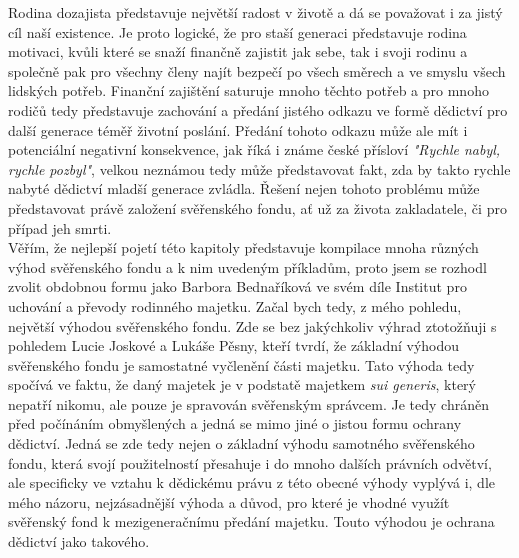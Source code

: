 \documentclass{article}
\begin{document}
 Rodina dozajista představuje největší radost v životě a dá se považovat i za jistý cíl naší existence. Je proto logické, že pro staší generaci představuje rodina motivaci, kvůli které se snaží finančně zajistit jak sebe, tak i svoji rodinu a společně pak pro všechny členy najít bezpečí po všech směrech a ve smyslu všech lidských potřeb. Finanční zajištění saturuje mnoho těchto potřeb a pro mnoho rodičů tedy představuje zachování a předání jistého odkazu ve formě dědictví pro další generace téměř životní poslání. Předání tohoto odkazu může ale mít i potenciální negativní konsekvence, jak říká i známe české přísloví \textit{"Rychle nabyl, rychle pozbyl"}, velkou neznámou tedy může představovat fakt, zda by takto rychle nabyté dědictví mladší generace zvládla. Řešení nejen tohoto problému může představovat právě založení svěřenského fondu, ať už za života zakladatele, či pro případ jeh smrti.\\
 
 Věřím, že nejlepší pojetí této kapitoly představuje kompilace mnoha různých výhod svěřenského fondu a k nim uvedeným příkladům, proto jsem se rozhodl zvolit obdobnou formu jako Barbora Bednaříková ve svém díle Institut pro uchování a převody rodinného majetku. Začal bych tedy, z mého pohledu, největší výhodou svěřenského fondu. Zde se bez jakýchkoliv výhrad ztotožňuji s pohledem Lucie Joskové a Lukáše Pěsny, kteří tvrdí, že základní výhodou svěřenského fondu je samostatné vyčlenění části majetku. Tato výhoda tedy spočívá ve faktu, že daný majetek je v podstatě majetkem \textit{sui generis}, který nepatří nikomu, ale pouze je spravován svěřenským správcem. Je tedy chráněn před počínáním obmyšlených a jedná se mimo jiné o jistou formu ochrany dědictví. Jedná se zde tedy nejen o základní výhodu samotného svěřenského fondu, která svojí použitelností přesahuje i do mnoho dalších právních odvětví, ale specificky ve vztahu k dědickému právu z této obecné výhody vyplývá i, dle mého názoru, nejzásadnější výhoda a důvod, pro které je vhodné využít svěřenský fond k mezigeneračnímu předání majetku. Touto výhodou je ochrana dědictví jako takového.\\

 
 
\end{document}
